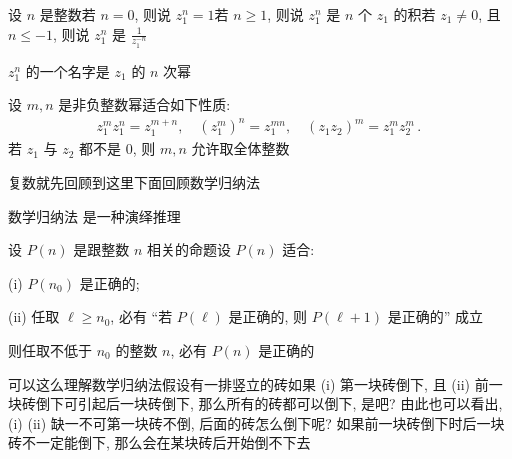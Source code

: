 \begin{definition}
    设 $n$ 是整数\period 若 $n=0$, 则说 $z_1^n = 1$\period 若 $n \geq 1$, 则说 $z_1^n$ 是 $n$ 个 $z_1$ 的积\period 若 $z_1 \neq 0$, 且 $n \leq -1$, 则说 $z_1^n$ 是 $\frac{1}{z_1^{-n}}$\period

    $z_1^n$ 的一个名字是 $z_1$ 的 $n$ 次幂 \period
\end{definition}

\begin{proposition}
    设 $m,n$ 是非负整数\period 幂适合如下性质:
    \begin{align*}
        z_1^m z_1^n = z_1^{m+n}, \quad (z_1^m)^n = z_1^{mn}, \quad (z_1 z_2)^m = z_1^m z_2^m \period
    \end{align*}
    若 $z_1$ 与 $z_2$ 都不是 $0$, 则 $m,n$ 允许取全体整数\period
\end{proposition}

复数就先回顾到这里\period 下面回顾数学归纳法\period

\begin{remark}
    数学归纳法  是一种演绎推理\period
\end{remark}

\begin{proposition}
    设 $P(n)$ 是跟整数 $n$ 相关的命题\period 设 $P(n)$ 适合:

    (i) $P(n_0)$ 是正确的;

    (ii) 任取 $\ell \geq n_0$, 必有 ``若 $P(\ell)$ 是正确的, 则 $P(\ell + 1)$ 是正确的'' 成立\period

    则任取不低于 $n_0$ 的整数 $n$, 必有 $P(n)$ 是正确的\period
\end{proposition}

\begin{remark}
    可以这么理解数学归纳法\period 假设有一排竖立的砖\period 如果 (i) 第一块砖倒下, 且 (ii) 前一块砖倒下可引起后一块砖倒下, 那么所有的砖都可以倒下, 是吧? 由此也可以看出, (i) (ii) 缺一不可\period 第一块砖不倒, 后面的砖怎么倒下呢? 如果前一块砖倒下时后一块砖不一定能倒下, 那么会在某块砖后开始倒不下去\period
\end{remark}


